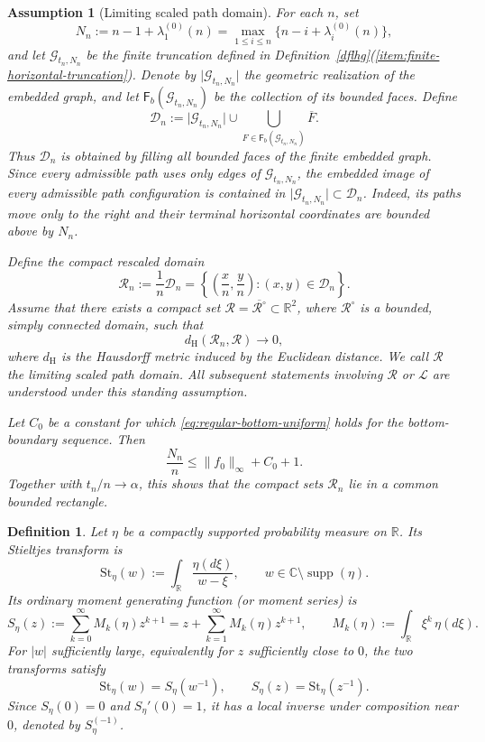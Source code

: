 \documentclass[11pt]{amsart}
\theoremstyle{plain}
\newtheorem{definition}[theorem]{Definition}
\newtheorem{assumption}[theorem]{Assumption}
\numberwithin{equation}{section}
\numberwithin{theorem}{section}
\numberwithin{figure}{section}
\begin{document}
\begin{assumption}[Limiting scaled path domain]
\label{ass:scaled-domain}
For each \(n\), set
\[
    N_n
    :=
    n-1+\lambda^{(0)}_1(n)
    =
    \max_{1\leq i\leq n}
    \bigl\{n-i+\lambda_i^{(0)}(n)\bigr\},
\]
and let \(\mathcal G_{t_n,N_n}\) be the finite truncation defined in
Definition~\ref{dflhg}(\ref{item:finite-horizontal-truncation}).
Denote by \(\lvert\mathcal G_{t_n,N_n}\rvert\) the geometric
realization of the embedded graph, and let
\(\mathsf F_b(\mathcal G_{t_n,N_n})\) be the collection of its
bounded faces. Define
\[
    \mathcal D_n
    :=
    \lvert\mathcal G_{t_n,N_n}\rvert
    \cup
    \bigcup_{F\in\mathsf F_b(\mathcal G_{t_n,N_n})}\overline F.
\]
Thus \(\mathcal D_n\) is obtained by filling all bounded faces of the
finite embedded graph. Since every admissible path uses only edges of
\(\mathcal G_{t_n,N_n}\), the embedded image of every admissible path
configuration is contained in
\(\lvert\mathcal G_{t_n,N_n}\rvert\subset\mathcal D_n\). Indeed, its
paths move only to the right and their terminal horizontal coordinates
are bounded above by \(N_n\).

Define the compact rescaled domain
\[
    \mathcal R_n
    :=
    \frac1n\mathcal D_n
    =
    \left\{
        \left(\frac{x}{n},\frac{y}{n}\right):(x,y)\in\mathcal D_n
      \right\}.
\]
Assume that there exists a compact set
\(\mathcal R=\overline{\mathcal R^{\circ}}\subset\mathbb R^2\), where
\(\mathcal R^{\circ}\) is a bounded, simply connected domain, such that
\[
    d_{\mathrm H}(\mathcal R_n,\mathcal R)
    \longrightarrow0,
\]
where \(d_{\mathrm H}\) is the Hausdorff metric induced by the Euclidean
distance. We call \(\mathcal R\) the limiting scaled path domain.
All subsequent statements involving \(\mathcal R\) or \(\mathcal L\)
are understood under this standing assumption.

Let \(C_0\) be a constant for which
\eqref{eq:regular-bottom-uniform} holds for the bottom-boundary
sequence. Then
\[
    \frac{N_n}{n}
    \leq
    \lVert f_0\rVert_\infty+C_0+1.
\]
Together with \(t_n/n\to\alpha\), this shows that the compact sets
\(\mathcal R_n\) lie in a common bounded rectangle.
\end{assumption}
\endgroup



\begin{definition}\label{def:transforms}
Let $\eta$ be a compactly supported probability measure on $\mathbb R$.  Its
Stieltjes transform is
\[
\mathrm{St}_\eta(w):=\int_{\mathbb R}\frac{\eta(d\xi)}{w-\xi},
\qquad w\in\mathbb C\setminus\operatorname{supp}(\eta).
\]
Its ordinary moment generating function (or moment series) is
\[
S_\eta(z):=\sum_{k=0}^{\infty}M_k(\eta)z^{k+1}
=z+\sum_{k=1}^{\infty}M_k(\eta)z^{k+1},
\qquad
M_k(\eta):=\int_{\mathbb R}\xi^k\,\eta(d\xi).
\]
For $|w|$ sufficiently large, equivalently for $z$ sufficiently close to
$0$, the two transforms satisfy
\[
\mathrm{St}_\eta(w)=S_\eta(w^{-1}),
\qquad
S_\eta(z)=\mathrm{St}_\eta(z^{-1}).
\]
Since $S_\eta(0)=0$ and $S_\eta'(0)=1$, it has a local inverse under
composition near $0$, denoted by $S_\eta^{(-1)}$.
\end{definition}
\end{document}
